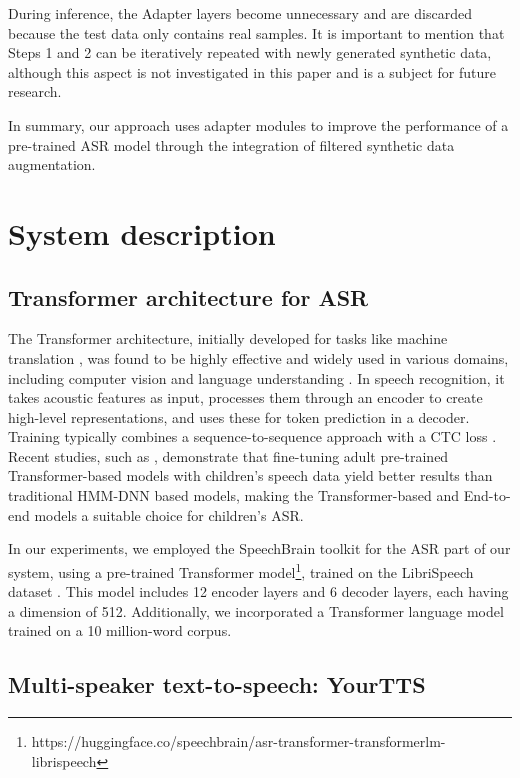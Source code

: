 During inference, the Adapter layers become unnecessary and are discarded because the test data only contains real samples. It is important to mention that Steps 1 and 2 can be iteratively repeated with newly generated synthetic data, although this aspect is not investigated in this paper and is a subject for future research.
 
In summary, our approach uses adapter modules to improve the performance of a pre-trained ASR model through the integration of filtered synthetic data augmentation.




\section{System description}
\label{section:SOA}
\subsection{Transformer architecture for ASR}
The Transformer architecture, initially developed for tasks like machine translation \cite{Transformer}, was found to be highly effective and widely used in various domains, including computer vision \cite{VIT} and language understanding \cite{Bert}. In speech recognition, it takes acoustic features as input, processes them through an encoder to create high-level representations, and uses these for token prediction in a decoder. Training typically combines a sequence-to-sequence approach with a CTC loss \cite{CTC}.
Recent studies, such as \cite{sri_end2end}, demonstrate that fine-tuning adult pre-trained Transformer-based models with children's speech data yield better results than traditional HMM-DNN based models, making the Transformer-based and End-to-end models a suitable choice for children's ASR.

In our experiments, we employed the SpeechBrain toolkit \cite{speechbrain} for the ASR part of our system, using a pre-trained Transformer model\footnote{https://huggingface.co/speechbrain/asr-transformer-transformerlm-librispeech}, trained on the LibriSpeech dataset \cite{librispeech}. This model includes 12 encoder layers and 6 decoder layers, each having a dimension of 512. Additionally, we incorporated a Transformer language model trained on a 10 million-word corpus.

\subsection{Multi-speaker text-to-speech: YourTTS}


